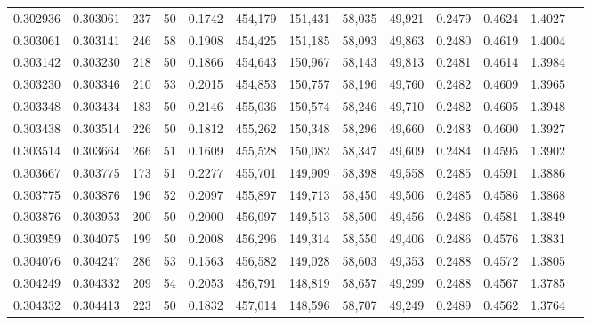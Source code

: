 \begin{tabular}{rrrrrrrrrrrrr}
0.302936 & 0.303061 &   237 &  50 &                                     0.1742 & 454,179 & 151,431 &  58,035 &  49,921 & 0.2479 & 0.4624 & 1.4027 \\
0.303061 & 0.303141 &   246 &  58 &                                     0.1908 & 454,425 & 151,185 &  58,093 &  49,863 & 0.2480 & 0.4619 & 1.4004 \\
0.303142 & 0.303230 &   218 &  50 &                                     0.1866 & 454,643 & 150,967 &  58,143 &  49,813 & 0.2481 & 0.4614 & 1.3984 \\
0.303230 & 0.303346 &   210 &  53 &                                     0.2015 & 454,853 & 150,757 &  58,196 &  49,760 & 0.2482 & 0.4609 & 1.3965 \\
0.303348 & 0.303434 &   183 &  50 &                                     0.2146 & 455,036 & 150,574 &  58,246 &  49,710 & 0.2482 & 0.4605 & 1.3948 \\
0.303438 & 0.303514 &   226 &  50 &                                     0.1812 & 455,262 & 150,348 &  58,296 &  49,660 & 0.2483 & 0.4600 & 1.3927 \\
0.303514 & 0.303664 &   266 &  51 &                                     0.1609 & 455,528 & 150,082 &  58,347 &  49,609 & 0.2484 & 0.4595 & 1.3902 \\
0.303667 & 0.303775 &   173 &  51 &                                     0.2277 & 455,701 & 149,909 &  58,398 &  49,558 & 0.2485 & 0.4591 & 1.3886 \\
0.303775 & 0.303876 &   196 &  52 &                                     0.2097 & 455,897 & 149,713 &  58,450 &  49,506 & 0.2485 & 0.4586 & 1.3868 \\
0.303876 & 0.303953 &   200 &  50 &                                     0.2000 & 456,097 & 149,513 &  58,500 &  49,456 & 0.2486 & 0.4581 & 1.3849 \\
0.303959 & 0.304075 &   199 &  50 &                                     0.2008 & 456,296 & 149,314 &  58,550 &  49,406 & 0.2486 & 0.4576 & 1.3831 \\
0.304076 & 0.304247 &   286 &  53 &                                     0.1563 & 456,582 & 149,028 &  58,603 &  49,353 & 0.2488 & 0.4572 & 1.3805 \\
0.304249 & 0.304332 &   209 &  54 &                                     0.2053 & 456,791 & 148,819 &  58,657 &  49,299 & 0.2488 & 0.4567 & 1.3785 \\
0.304332 & 0.304413 &   223 &  50 &                                     0.1832 & 457,014 & 148,596 &  58,707 &  49,249 & 0.2489 & 0.4562 & 1.3764 \\

\end{tabular}
